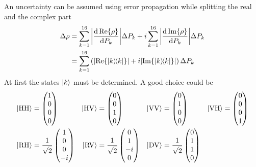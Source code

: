 An uncertainty can be assumed using error propagation while splitting the real and the complex part
\begin{subequations}
\label{eq:a:drho}
\begin{align}
\Delta \rho
    &=\sum_{k=1}^{16}\abs{\frac{\dd\Re{\rho}}{\dd P_k}}\Delta P_k+i\sum_{k=1}^{16}\abs{\frac{\dd\Im{\rho}}{\dd P_k}}\Delta P_k
    \label{eq:a:drho:1}\\
    &=\sum_{k=1}^{16}\left(\abs{\Re{\ketbra{k}}}+i\abs{\Im{\ketbra{k}}}\right)\Delta P_k
    \label{eq:a:drho:2}
\end{align}
\end{subequations}
At first the states $\ket{k}$ must be determined.
A good choice could be
\begin{align*}
\state{HH}
    &=\begin{pmatrix} 1\\ 0\\ 0\\ 0\end{pmatrix}
    &\state{HV}
    &=\begin{pmatrix} 0\\ 0\\ 1\\ 0\end{pmatrix}
    &\state{VV}
    &=\begin{pmatrix} 0\\ 1\\ 0\\ 0\end{pmatrix}
    &\state{VH}
    &=\begin{pmatrix} 0\\ 0\\ 0\\ 1\end{pmatrix}
    \\
\state{RH}
    &=\frac{1}{\sqrt{2}}\begin{pmatrix} 1\\ 0\\ 0\\-i\end{pmatrix}
    &\state{RV}
    &=\frac{1}{\sqrt{2}}\begin{pmatrix} 0\\ 1\\-i\\ 0\end{pmatrix}
    &\state{DV}
    &=\frac{1}{\sqrt{2}}\begin{pmatrix} 0\\ 1\\ 1\\ 0\end{pmatrix}

\end{align*}
